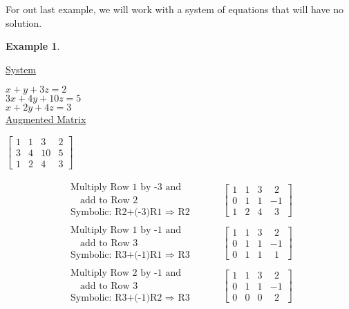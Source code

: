 \documentclass[12pt]{book}
\theoremstyle{definition}
\newtheorem{example}{Example}
\begin{document}
For out last example, we will work with a system of equations that will have no solution.
\begin{example}
\end{example}
\begin{center}
\begin{multicols}{2}
\underline{System}\par
$x+y+3z=2$\\
$3x+4y+10z=5$\\
$x+2y+4z=3$\\
\underline{Augmented Matrix}\par
$\left[\begin{array}{ccc|c}
1 & 1 & 3 & 2\\
3 & 4 & 10 & 5\\
1 & 2 & 4 & 3
\end{array}\right]$
\end{multicols}
\end{center}
\begin{eqnarray*}
\begin{array}{l}
\text{Multiply Row 1 by -3 and}\\
\text{~~~add to Row 2}\\
\text{Symbolic: R2+(-3)R1~}\Rightarrow \text{~R2}
\end{array}
&&
~~~~~~\left[
\begin{array}{ccc|c}
1 & 1 & 3 & ~~2\\
0 & 1 & 1 & -1\\
1 & 2 & 4 & ~~3
\end{array}
\right]
\end{eqnarray*}
\begin{eqnarray*}
\begin{array}{l}
\text{Multiply Row 1 by -1 and}\\
\text{~~~add to Row 3}\\
\text{Symbolic: R3+(-1)R1~}\Rightarrow \text{~R3}
\end{array}
&&
~~~~~~\left[
\begin{array}{ccc|c}
1 & 1 & 3 & ~~2\\
0 & 1 & 1 & -1\\
0 & 1 & 1 & ~~1
\end{array}
\right]
\end{eqnarray*}
\begin{eqnarray*}
\begin{array}{l}
\text{Multiply Row 2 by -1 and}\\
\text{~~~add to Row 3}\\
\text{Symbolic: R3+(-1)R2~}\Rightarrow \text{~R3}
\end{array}
&&
~~~~~~\left[
\begin{array}{ccc|c}
1 & 1 & 3 & ~~2\\
0 & 1 & 1 & -1\\
0 & 0 & 0 & ~~2
\end{array}
\right]
\end{eqnarray*}
\end{document}
